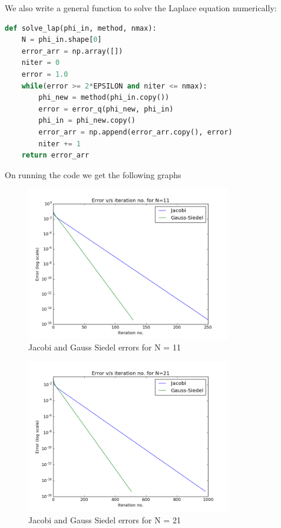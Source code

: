 \documentclass[11pt, a4paper]{article}
\begin{document}
We also write a general function to solve the Laplace equation numerically:
\begin{lstlisting}[language = Python, caption = Function to solve Laplace equation by given method]
def solve_lap(phi_in, method, nmax):
    N = phi_in.shape[0]
    error_arr = np.array([])
    niter = 0
    error = 1.0
    while(error >= 2*EPSILON and niter <= nmax):
        phi_new = method(phi_in.copy())
        error = error_q(phi_new, phi_in)
        phi_in = phi_new.copy()
        error_arr = np.append(error_arr.copy(), error)
        niter += 1
    return error_arr
\end{lstlisting}

On running the code we get the following graphs
\begin{figure}[H]
 \centering
 \includegraphics[width = 0.8\textwidth]{N_11.png}
 \caption{Jacobi and Gauss Siedel errors for N = 11}
\end{figure}

\begin{figure}[H]
 \centering
 \includegraphics[width = 0.8\textwidth]{N_21.png}
 \caption{Jacobi and Gauss Siedel errors for N = 21}
\end{figure}
\end{document}
